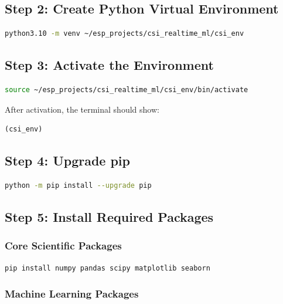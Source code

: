 \documentclass[12pt,a4paper]{article}
\begin{document}
\subsection{Step 2: Create Python Virtual Environment}

\begin{lstlisting}[language=bash]
python3.10 -m venv ~/esp_projects/csi_realtime_ml/csi_env
\end{lstlisting}

\subsection{Step 3: Activate the Environment}

\begin{lstlisting}[language=bash]
source ~/esp_projects/csi_realtime_ml/csi_env/bin/activate
\end{lstlisting}

After activation, the terminal should show:

\begin{verbatim}
(csi_env)
\end{verbatim}

\subsection{Step 4: Upgrade pip}

\begin{lstlisting}[language=bash]
python -m pip install --upgrade pip
\end{lstlisting}

\subsection{Step 5: Install Required Packages}

\subsubsection{Core Scientific Packages}

\begin{lstlisting}[language=bash]
pip install numpy pandas scipy matplotlib seaborn
\end{lstlisting}

\subsubsection{Machine Learning Packages}
\end{document}
